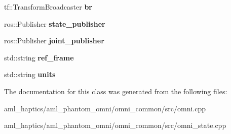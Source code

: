 \begin{DoxyCompactItemize}
\item 
\hypertarget{class_phantom_r_o_s_a37ff0c741023d451cbaf06af36210a90}{tf\-::\-Transform\-Broadcaster {\bfseries br}}\label{class_phantom_r_o_s_a37ff0c741023d451cbaf06af36210a90}

\item 
\hypertarget{class_phantom_r_o_s_a561ff759fdafb129745b6ff80415566b}{ros\-::\-Publisher {\bfseries state\-\_\-publisher}}\label{class_phantom_r_o_s_a561ff759fdafb129745b6ff80415566b}

\item 
\hypertarget{class_phantom_r_o_s_af1eb91c0b12b545679721c6551066d47}{ros\-::\-Publisher {\bfseries joint\-\_\-publisher}}\label{class_phantom_r_o_s_af1eb91c0b12b545679721c6551066d47}

\item 
\hypertarget{class_phantom_r_o_s_a1faf70c3b02b5549c0bd4a087376a4fc}{std\-::string {\bfseries ref\-\_\-frame}}\label{class_phantom_r_o_s_a1faf70c3b02b5549c0bd4a087376a4fc}

\item 
\hypertarget{class_phantom_r_o_s_ac1b13131ca13e91fb2a9b8b4a0793cfe}{std\-::string {\bfseries units}}\label{class_phantom_r_o_s_ac1b13131ca13e91fb2a9b8b4a0793cfe}

\end{DoxyCompactItemize}


The documentation for this class was generated from the following files\-:\begin{DoxyCompactItemize}
\item 
aml\-\_\-haptics/aml\-\_\-phantom\-\_\-omni/omni\-\_\-common/src/omni.\-cpp\item 
aml\-\_\-haptics/aml\-\_\-phantom\-\_\-omni/omni\-\_\-common/src/omni\-\_\-state.\-cpp\end{DoxyCompactItemize}
